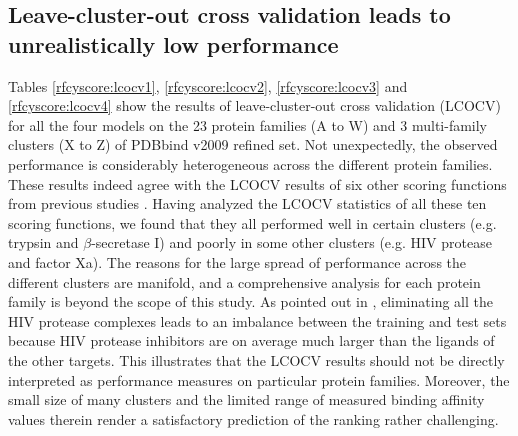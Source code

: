 \subsection{Leave-cluster-out cross validation leads to unrealistically low performance}

Tables \ref{rfcyscore:lcocv1}, \ref{rfcyscore:lcocv2}, \ref{rfcyscore:lcocv3} and \ref{rfcyscore:lcocv4} show the results of leave-cluster-out cross validation (LCOCV) for all the four models on the 23 protein families (A to W) and 3 multi-family clusters (X to Z) of PDBbind v2009 refined set. Not unexpectedly, the observed performance is considerably heterogeneous across the different protein families. These results indeed agree with the LCOCV results of six other scoring functions from previous studies \citep{774,1414,1194,1410,1347,1415}. Having analyzed the LCOCV statistics of all these ten scoring functions, we found that they all performed well in certain clusters (e.g. trypsin and $\beta$-secretase I) and poorly in some other clusters (e.g. HIV protease and factor Xa). The reasons for the large spread of performance across the different clusters are manifold, and a comprehensive analysis for each protein family is beyond the scope of this study. As pointed out in \citep{1347}, eliminating all the HIV protease complexes leads to an imbalance between the training and test sets because HIV protease inhibitors are on average much larger than the ligands of the other targets. This illustrates that the LCOCV results should not be directly interpreted as performance measures on particular protein families. Moreover, the small size of many clusters and the limited range of measured binding affinity values therein render a satisfactory prediction of the ranking rather challenging.


